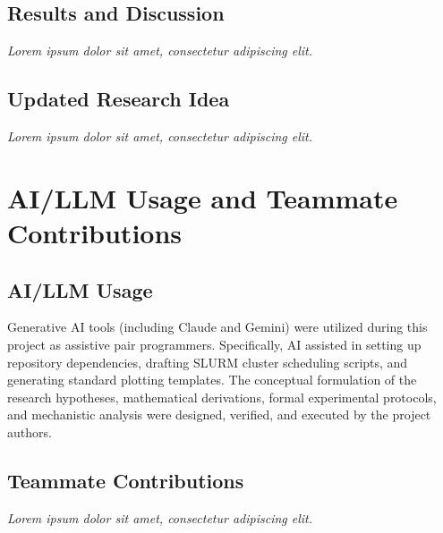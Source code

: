 \documentclass{article}
\newcommand{\dummytext}{\textit{Lorem ipsum dolor sit amet, consectetur adipiscing elit.}}
\begin{document}
\subsection{Results and Discussion}
\dummytext

\subsection{Updated Research Idea}
\dummytext




\clearpage
\appendix

\section{AI/LLM Usage and Teammate Contributions}

\subsection{AI/LLM Usage}
Generative AI tools (including Claude and Gemini) were utilized during this project as assistive pair programmers. Specifically, AI assisted in setting up repository dependencies, drafting SLURM cluster scheduling scripts, and generating standard plotting templates. The conceptual formulation of the research hypotheses, mathematical derivations, formal experimental protocols, and mechanistic analysis were designed, verified, and executed by the project authors.

\subsection{Teammate Contributions}
\dummytext
\end{document}
